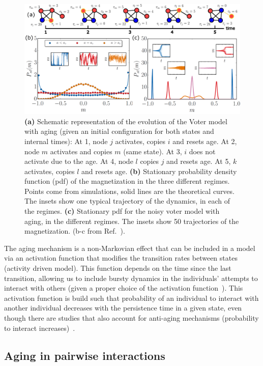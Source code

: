 \begin{figure}[t]
    \centering
    \captionsetup{font=sf}
    \includegraphics[width=\textwidth]{Figs/Introduction/aging_plot.pdf}
    \caption[Aging in the Voter model]{\textbf{(a)} Schematic representation of the evolution of the Voter model with aging (given an initial configuration for both states and internal times): At 1, node $j$ activates, copies $i$ and resets age. At 2, node $m$ activates and copies $m$ (same state). At 3, $i$ does not activate due to the age. At 4, node $l$ copies $j$ and resets age. At 5, $k$ activates, copies $l$ and resets age. \textbf{(b)} Stationary probability density function (pdf) of the magnetization in the three different regimes. Points come from simulations, solid lines are the theoretical curves. The insets show one typical trajectory of the dynamics, in each of the regimes. \textbf{(c)} Stationary pdf for the noisy voter model with aging, in the different regimes. The insets show 50 trajectories of the magnetization. (b-c from Ref.~\cite{artime-2017}).}
    \label{fig:aging_pdf}
\end{figure}

The aging mechanism is a non-Markovian effect that can be included in a model via an activation function that modifies the transition rates between states (activity driven model). This function depends on the time since the last transition, allowing us to include bursty dynamics in the individuals' attempts to interact with others (given a proper choice of the activation function~\cite{fernandez-gracia-2011}). This activation function is build such that probability of an individual to interact with another individual decreases with the persistence time in a given state, even though there are studies that also account for anti-aging mechanisms (probability to interact increases)~\cite{peralta-2020C,chen-2020}.

\subsection{\label{sec:Aging in pairwise interactions} Aging in pairwise interactions}

